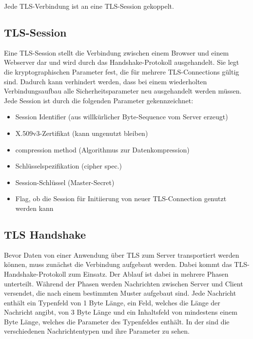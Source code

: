 \documentclass[12pt]{scrartcl}
\begin{document}
Jede TLS-Verbindung ist an eine TLS-Session gekoppelt.

\subsection{TLS-Session}

Eine TLS-Session stellt die Verbindung zwischen einem Browser und einem Webserver dar und wird durch das Handshake-Protokoll ausgehandelt. Sie legt die kryptographischen Parameter fest, die für mehrere TLS-Connections gültig sind. Dadurch kann verhindert werden, dass bei einem wiederholten Verbindungsaufbau alle Sicherheitsparameter neu ausgehandelt werden müssen. Jede Session ist durch die folgenden Parameter gekennzeichnet:

\begin{itemize}
	\item Session Identifier (aus willkürlicher Byte-Sequence vom Server erzeugt)
	\item X.509v3-Zertifikat (kann ungenutzt bleiben)
	\item compression method (Algorithmus zur Datenkompression)
	\item Schlüsselspezifikation (cipher spec.)
	\item Session-Schlüssel (Master-Secret)
	\item Flag, ob die Session für Initiierung von neuer TLS-Connection genutzt werden kann
\end{itemize}

\subsection{TLS Handshake}
Bevor Daten von einer Anwendung über TLS zum Server transportiert werden können, muss zunächst die Verbindung aufgebaut werden. Dabei kommt das TLS-Handshake-Protokoll zum Einsatz. Der Ablauf ist dabei in mehrere Phasen unterteilt. Während der Phasen werden Nachrichten zwischen Server und Client versendet, die nach einem bestimmten Muster aufgebaut sind. Jede Nachricht enthält ein Typenfeld von 1 Byte Länge, ein Feld, welches die Länge der Nachricht angibt, von 3 Byte Länge und ein Inhaltsfeld von mindestens einem Byte Länge, welches die Parameter des Typenfeldes enthält. In der  sind die verschiedenen Nachrichtentypen und ihre Parameter zu sehen.
\end{document}
